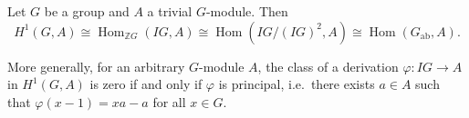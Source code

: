 Let $G$ be a group and $A$ a trivial $G$-module. Then
$$H^1(G, A) \cong \operatorname{Hom}_{\mathbb{Z}G}(IG, A) \cong \operatorname{Hom}(IG/(IG)^2, A) \cong \operatorname{Hom}(G_{\text{ab}}, A).$$

More generally, for an arbitrary $G$-module $A$, the class of a derivation $\varphi: IG \to A$ in $H^1(G, A)$ is zero if and only if $\varphi$ is principal, i.e.\ there exists $a \in A$ such that $\varphi(x-1) = xa - a$ for all $x \in G$.
